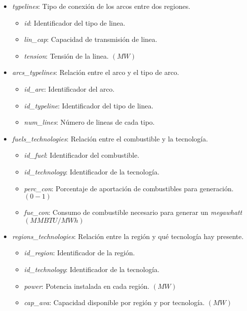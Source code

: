 \begin{itemize}
	\item \textit{typelines}: Tipo de conexión de los arcos entre dos regiones.
	\begin{itemize}
		\item \textit{id}: Identificador del tipo de linea.		
		\item \textit{lin\_cap}: Capacidad de transmisión de linea.
		\item \textit{tension}: Tensión de la linea. $ (MW) $
	\end{itemize}

	\item \textit{arcs\_typelines}: Relación entre el arco y el tipo de arco.
	\begin{itemize}
		\item \textit{id\_arc}: Identificador del arco.
		\item \textit{id\_typeline}: Identificador del tipo de linea.
		\item \textit{num\_lines}: Número de lineas de cada tipo.
	\end{itemize}
	
	\item \textit{fuels\_technologies}: Relación entre el combustible y la tecnología.
	\begin{itemize}
		\item \textit{id\_fuel}: Identificador del combustible.
		\item \textit{id\_technology}: Identificador de la tecnología.
		\item \textit{perc\_con}: Porcentaje de aportación de combustibles para generación. $ (0 - 1) $
		\item \textit{fue\_con}: Consumo de combustible necesario para generar un \textit{megawhatt} $ (MMBTU/MWh) $
	\end{itemize}

	\item \textit{regions\_technologies}: Relación entre la región y qué tecnología hay presente.
	\begin{itemize}
		\item \textit{id\_region}: Identificador de la región.
		\item \textit{id\_technology}: Identificador de la tecnología.
		\item \textit{power}: Potencia instalada en cada región. $ (MW) $
		\item \textit{cap\_ava}: Capacidad disponible por región y por tecnología. $ (MW) $
	\end{itemize}
	

\end{itemize}
